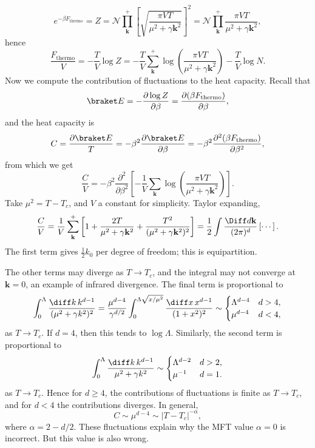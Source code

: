 \documentclass[12pt]{article}
\begin{document}
\[
	e^{-\beta F_{\mathrm{thermo}}} = Z = \mathcal{N}\prod_{\mathbf{k}}^+ \left[ \sqrt{\frac{\pi V T}{\mu^2 + \gamma \mathbf{k}^2}} \right]^2 = \mathcal{N} \prod_{\mathbf{k}}^+ \frac{\pi V T}{\mu^2 + \gamma \mathbf{k}^2},
\]
hence
\[
\frac{F_{\mathrm{thermo}}}{V} = - \frac{T}{V} \log Z = - \frac{T}{V} \sum_{\mathbf{k}}^+ \log \left( \frac{\pi V T}{\mu^2 + \gamma \mathbf{k}^2} \right) - \frac{T}{V} \log N.
\]
Now we compute the contribution of fluctuations to the heat capacity. Recall that
\[
\braket E = - \frac{\partial \log Z}{\partial \beta} = \frac{\partial (\beta F_{\mathrm{thermo}})}{\partial \beta},
\]
and the heat capacity is
\[
C = \frac{\partial \braket E}{T} = - \beta^2 \frac{\partial \braket E}{\partial \beta} = - \beta^2\frac{\partial^2 (\beta F_{\mathrm{thermo}})}{\partial \beta^2},
\]
from which we get
\[
	\frac{C}{V} = - \beta^2 \frac{\partial^2}{\partial \beta^2} \left[ - \frac{1}{V} \sum_{\mathbf{k}} \log \left( \frac{\pi V T}{\mu^2 + \gamma \mathbf{k}^2} \right) \right].
\]
Take $\mu^2 = T - T_c$, and $V$ a constant for simplicity. Taylor expanding,
\[
	\frac{C}{V} = \frac{1}{V} \sum^+_{\mathbf{k}} \left[1 + \frac{2T}{\mu^2 + \gamma \mathbf{k}^2} + \frac{T^2}{(\mu^2 + \gamma \mathbf{k}^2)^2} \right] = \frac{1}{2} \int \frac{\Diff d \mathbf{k}}{(2 \pi)^d} \left[ \cdots \right].
\]
The first term gives $\frac{1}{2} k_0$ per degree of freedom; this is equipartition.

The other terms may diverge as $T \to T_c$, and the integral may not converge at $\mathbf{k} = 0$, an example of infrared divergence. The final term is proportional to
\[
	\int_0^\Lambda \frac{\diff k \, k^{d-1}}{(\mu^2 + \gamma k^2)^2} = \frac{\mu^{d-4}}{\gamma^{d/2}} \int_{0}^{\Lambda \sqrt{x/\mu^2}} \frac{\diff x\, x^{d-1}}{(1 + x^2)^2} \sim
	\begin{cases}
		\Lambda^{d-4} & d > 4, \\
		\mu^{d-4} & d < 4,
	\end{cases}	
\]
as $T \to T_c$. If $d = 4$, then this tends to $\log \Lambda$. Similarly, the second term is proportional to
\[
\int_0^\Lambda \frac{\diff k \, k^{d-1}}{\mu^2 + \gamma k^2} \sim
\begin{cases}
	\Lambda^{d-2} & d > 2, \\
	\mu^{-1} & d = 1.
\end{cases}
\]
as $T \to T_c$. Hence for $d \geq 4$, the contributions of fluctuations is finite as $T \to T_c$, and for $d < 4$ the contributions diverges. In general,
\[
C \sim \mu^{d-4} \sim |T - T_c|^{-\alpha},
\]
where $\alpha = 2 - d/2$. These fluctuations explain why the MFT value $\alpha = 0$ is incorrect. But this value is also wrong.
\end{document}
